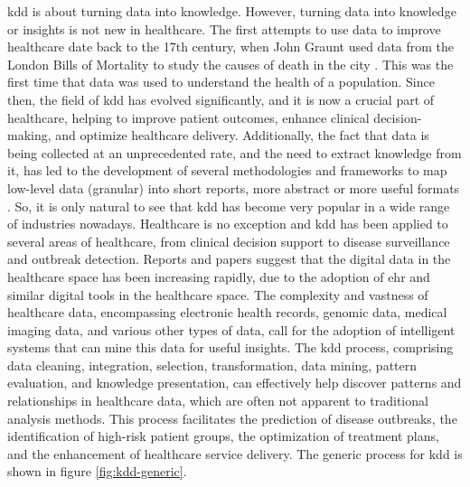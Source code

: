 
\ac{kdd} is about turning data into knowledge. However, turning data into knowledge or insights is not new in healthcare. The first attempts to use data to improve healthcare date back to the 17th century, when John Graunt used data from the London Bills of Mortality to study the causes of death in the city \cite{741e4dcd-5d3c-325c-9241-5eb5ddd0cb60}. This was the first time that data was used to understand the health of a population. Since then, the field of \ac{kdd} has evolved significantly, and it is now a crucial part of healthcare, helping to improve patient outcomes, enhance clinical decision-making, and optimize healthcare delivery.
Additionally, the fact that data is being collected at an unprecedented rate, and the need to extract knowledge from it, has led to the development of several methodologies and frameworks to map low-level data (granular) into short reports, more abstract or more useful formats \cite{Fayyad_Piatetsky-Shapiro_Smyth_1996}. So, it is only natural to see that \ac{kdd} has become very popular in a wide range of industries nowadays.
Healthcare is no exception and \ac{kdd} has been applied to several areas of healthcare, from clinical decision support to disease surveillance and outbreak detection. Reports and papers suggest that \cite{dashBigDataHealthcare2019} the digital data in the healthcare space has been increasing rapidly, due to the adoption of \ac{ehr} and similar digital tools in the healthcare space.  The complexity and vastness of healthcare data, encompassing electronic health records, genomic data, medical imaging data, and various other types of data, call for the adoption of intelligent systems that can mine this data for useful insights. The \ac{kdd} process, comprising data cleaning, integration, selection, transformation, data mining, pattern evaluation, and knowledge presentation, can effectively help discover patterns and relationships in healthcare data, which are often not apparent to traditional analysis methods. This process facilitates the prediction of disease outbreaks, the identification of high-risk patient groups, the optimization of treatment plans, and the enhancement of healthcare service delivery. The generic process for \ac{kdd} is shown in figure \ref{fig:kdd-generic}.

